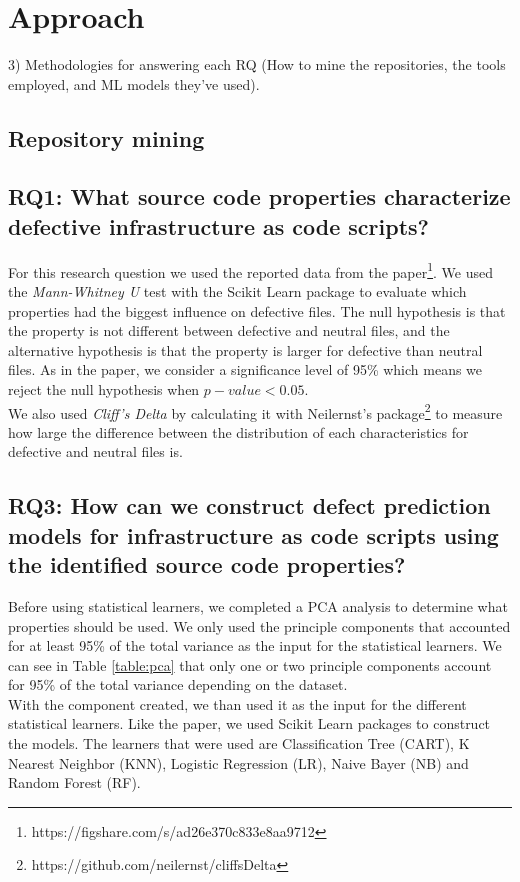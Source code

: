 
\section{Approach}
\label{sec:approach}
3) Methodologies for answering each RQ (How to mine the repositories, the tools employed, and ML models they've used).
\subsection{Repository mining}
\subsection{RQ1: What source code properties characterize defective infrastructure as code scripts?}
For this research question we used the reported data from the 
paper\footnote{https://figshare.com/s/ad26e370c833e8aa9712}.
We used the \emph{Mann-Whitney U} test with the Scikit Learn package
to evaluate which properties had the biggest influence on defective files. 
The null hypothesis is that the property is not different between defective and 
neutral files, and the alternative hypothesis is that the property is larger for 
defective than neutral files. As in the paper, we consider a significance level of 
95\% which means we reject the null hypothesis when $ p-value < 0.05 $. \\

We also used \emph{Cliff's Delta} by calculating it with Neilernst's package\footnote{https://github.com/neilernst/cliffsDelta}
to measure how large the difference between the distribution of each characteristics
for defective and neutral files is. 

\subsection{RQ3: How can we construct defect prediction models for 
infrastructure as code scripts using the identified source code properties?}
Before using statistical learners, we completed a PCA analysis to determine 
what properties should be used. We only used the principle components that accounted
for at least 95\% of the total variance as the input for the statistical learners.
We can see in Table \ref{table:pca} that only one or two principle components 
account for 95\% of the total variance depending on the dataset. \\

With the component created, we than used it as the input for the different
statistical learners. Like the paper, we used Scikit Learn packages to construct
the models. The learners that were used are Classification Tree (CART),
K Nearest Neighbor (KNN), Logistic Regression (LR), Naive Bayer (NB) and 
Random Forest (RF). \\

